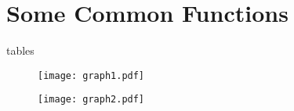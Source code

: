\documentclass[float=false, crop=false]{standalone}
\begin{document}
\section*{Some Common Functions}
{tables}

\begin{figure}[h!]
\centering
\texttt{[image: graph1.pdf]}
\end{figure}

\begin{figure}[h!]
\centering
\texttt{[image: graph2.pdf]}
\end{figure}
\end{document}

